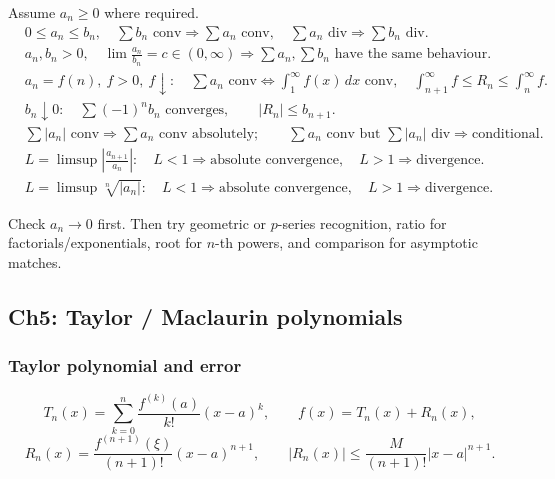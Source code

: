 \begin{keyformula}[title={Core Convergence Tests}]
Assume \(a_n\ge0\) where required.
\begin{align*}
&0\le a_n\le b_n,
\quad \sum b_n\text{ conv}\Rightarrow\sum a_n\text{ conv},
\quad \sum a_n\text{ div}\Rightarrow\sum b_n\text{ div}.\\
&a_n,b_n>0,
\quad \lim\frac{a_n}{b_n}=c\in(0,\infty)
\Rightarrow \sum a_n,\sum b_n\text{ have the same behaviour}.\\
&a_n=f(n),\ f>0,\ f\downarrow:
\quad \sum a_n\text{ conv}\Longleftrightarrow \int_1^\infty f(x)\,dx\text{ conv},
\quad
\int_{n+1}^\infty f\le R_n\le\int_n^\infty f.\\
&b_n\downarrow0:
\quad \sum (-1)^n b_n\text{ converges},
\qquad |R_n|\le b_{n+1}.\\
&\sum |a_n|\text{ conv}\Rightarrow\sum a_n\text{ conv absolutely};
\qquad
\sum a_n\text{ conv but }\sum|a_n|\text{ div}\Rightarrow\text{conditional}.\\
&L=\limsup\left|\frac{a_{n+1}}{a_n}\right|:
\quad L<1\Rightarrow\text{absolute convergence},
\quad L>1\Rightarrow\text{divergence}.\\
&L=\limsup\sqrt[n]{|a_n|}:
\quad L<1\Rightarrow\text{absolute convergence},
\quad L>1\Rightarrow\text{divergence}.
\end{align*}
\end{keyformula}

\begin{examtip}
Check \(a_n\to0\) first.  Then try geometric or \(p\)-series recognition,
ratio for factorials/exponentials, root for \(n\)-th powers, and comparison for
asymptotic matches.
\end{examtip}

\subsection{Ch5: Taylor / Maclaurin polynomials}

\subsubsection{Taylor polynomial and error}
\begin{keyformula}[title={Taylor Polynomial and Lagrange Remainder}]
\[
T_n(x)=\sum_{k=0}^{n}\frac{f^{(k)}(a)}{k!}(x-a)^k,
\qquad
f(x)=T_n(x)+R_n(x),
\]
\[
R_n(x)=\frac{f^{(n+1)}(\xi)}{(n+1)!}(x-a)^{n+1},
\qquad
|R_n(x)|\le \frac{M}{(n+1)!}|x-a|^{n+1}.
\]
\end{keyformula}

